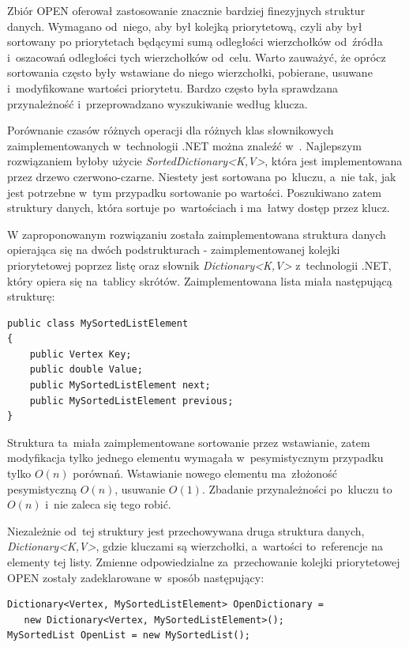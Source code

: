 \documentclass[a4paper,11pt,twoside,openright]{report}
\theoremstyle{definition}
\begin{document}
Zbiór OPEN oferował zastosowanie znacznie bardziej finezyjnych struktur danych.
Wymagano od~niego, aby był kolejką priorytetową, czyli aby był sortowany po
priorytetach będącymi sumą odległości wierzchołków od~źródła i~oszacowań odległości
tych wierzchołków od~celu. Warto zauważyć, że oprócz sortowania często były wstawiane
do niego wierzchołki, pobierane, usuwane i~modyfikowane wartości priorytetu.
Bardzo często była sprawdzana przynależność i~przeprowadzano
wyszukiwanie według klucza.

Porównanie czasów różnych operacji dla różnych klas słownikowych zaimplementowanych
w~technologii .NET można znaleźć w~\cite{C w pigulce}.
Najlepszym rozwiązaniem byłoby użycie \textit{SortedDictionary<K,V>},
która jest implementowana przez drzewo czerwono-czarne. Niestety jest
sortowana po~kluczu, a~nie tak, jak jest potrzebne w~tym przypadku sortowanie
po wartości. Poszukiwano zatem struktury danych, która sortuje po~wartościach
i ma~łatwy dostęp przez klucz.

W zaproponowanym rozwiązaniu została zaimplementowana struktura danych opierająca się
na dwóch podstrukturach - zaimplementowanej kolejki priorytetowej poprzez listę
oraz słownik \textit{Dictionary<K,V>} z~technologii .NET, który opiera się na~tablicy
skrótów. Zaimplementowana lista miała następującą strukturę:

\begin{verbatim}
public class MySortedListElement
{
    public Vertex Key;
    public double Value;
    public MySortedListElement next;
    public MySortedListElement previous;
}
\end{verbatim}

Struktura ta~miała zaimplementowane sortowanie przez wstawianie, zatem modyfikacja
tylko jednego elementu wymagała w~pesymistycznym przypadku tylko $O(n)$ porównań.
Wstawianie nowego elementu ma~złożoność pesymistyczną $O(n)$, usuwanie $O(1)$.
Zbadanie przynależności po~kluczu to~$O(n)$ i~nie zaleca się tego robić.

Niezależnie od~tej struktury jest przechowywana druga struktura danych,
\textit{Dictionary<K,V>}, gdzie kluczami są wierzchołki, a~wartości to~referencje na
elementy tej listy. Zmienne odpowiedzialne za~przechowanie kolejki priorytetowej
OPEN zostały zadeklarowane w~sposób następujący:

\begin{verbatim}
Dictionary<Vertex, MySortedListElement> OpenDictionary =
   new Dictionary<Vertex, MySortedListElement>();
MySortedList OpenList = new MySortedList();
\end{verbatim}
\end{document}
